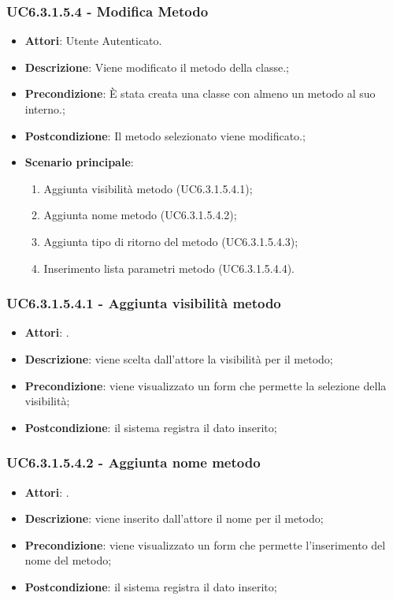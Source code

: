 \subsubsection{UC6.3.1.5.4 - Modifica Metodo} 
\label{sssec:UC6.3.1.5.4} 
\begin{itemize} 
\item \textbf{Attori}: Utente Autenticato.
\item \textbf{Descrizione}: Viene modificato il metodo della classe.;
\item \textbf{Precondizione}: È stata creata una classe con almeno un metodo al suo interno.;
\item \textbf{Postcondizione}: Il metodo selezionato viene modificato.;
\item \textbf{Scenario principale}: \begin{enumerate}\item Aggiunta visibilità metodo (UC6.3.1.5.4.1);\item Aggiunta nome metodo (UC6.3.1.5.4.2);\item Aggiunta tipo di ritorno del metodo (UC6.3.1.5.4.3);\item Inserimento lista parametri metodo (UC6.3.1.5.4.4). 
 \end{enumerate}
\end{itemize} 
\subsubsection{UC6.3.1.5.4.1 - Aggiunta visibilità metodo} 
\label{sssec:UC6.3.1.5.4.1} 
\begin{itemize} 
\item \textbf{Attori}: .
\item \textbf{Descrizione}: viene scelta dall'attore la visibilità per il metodo;
\item \textbf{Precondizione}: viene visualizzato un form che permette la selezione della visibilità;
\item \textbf{Postcondizione}: il sistema registra il dato inserito;
\end{itemize} 
\subsubsection{UC6.3.1.5.4.2 - Aggiunta nome metodo} 
\label{sssec:UC6.3.1.5.4.2} 
\begin{itemize} 
\item \textbf{Attori}: .
\item \textbf{Descrizione}: viene inserito dall'attore il nome per il metodo;
\item \textbf{Precondizione}: viene visualizzato un form che permette l'inserimento del nome del metodo;
\item \textbf{Postcondizione}: il sistema registra il dato inserito;
\end{itemize} 
